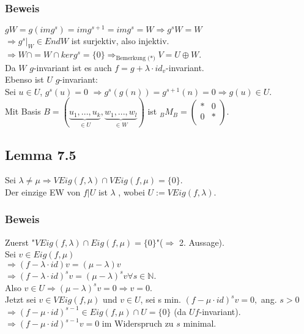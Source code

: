 \documentclass[a4paper, 12pt]{extarticle}
\begin{document}
\subsubsection*{Beweis}
$gW = g(img^s) = img^{s+1} = img^s = W \Rightarrow g^sW = W$\\
$\Rightarrow g^s|_W \in EndW$ ist surjektiv, also injektiv.\\
$\Rightarrow W \cap = W \cap kerg^s = \{ 0 \} \Rightarrow_{\text{Bemerkung (*)}} V = U\oplus W$.\\
Da $W$ $g$-invariant ist es auch $f = g + \lambda \cdot id_v$-invariant.\\
Ebenso ist $U$ $g$-invariant: \\
Sei $u\in U$, $g^s(u) = 0$
$\Rightarrow g^s(g(n)) = g^{s+1}(n) = 0 \Rightarrow g(u) \in U$.\\
Mit Basis $B = (\underbrace{u_1, ..., u_k}_{\in U}, \underbrace{w_1, ..., w_l}_{\in W})$ ist ${}_{B}M_{B} = \left( \begin{matrix}
	* & 0 \\
	0 & *\\ 
\end{matrix} \right)$.\\
\subsection*{Lemma 7.5}
Sei $\lambda \neq \mu \Rightarrow VEig(f, \lambda) \cap VEig(f, \mu) = \{0\}$.\\
Der einzige EW von $f|U$ ist $\lambda$ , wobei $U := VEig(f, \lambda)$.
\subsubsection*{Beweis}
Zuerst "$VEig(f,\lambda) \cap Eig(f, \mu) = \{0\}$"($\Rightarrow$ 2. Aussage).\\
Sei $v\in Eig(f, \mu)$\\
$\Rightarrow (f-\lambda \cdot id)v = (\mu - \lambda)v$\\
$\Rightarrow (f-\lambda \cdot id)^sv = (\mu - \lambda)^sv \forall s \in \mathbb{N}$.\\
Also $v\in U \Rightarrow (\mu - \lambda)^sv = 0 \Rightarrow v = 0$.\\
Jetzt sei $v \in VEig(f,\mu)$ und $v\in U$, sei s min. $(f-\mu \cdot id)^sv = 0,$ ang. $s > 0$\\
$\Rightarrow (f-\mu \cdot id)^{s-1} \in Eig(f,\mu) \cap U = \{0\}$ (da $U f$-invariant).\\
$\Rightarrow (f-\mu \cdot id)^{s-1}v = 0$ im Widerspruch zu $s$ minimal.
\end{document}
